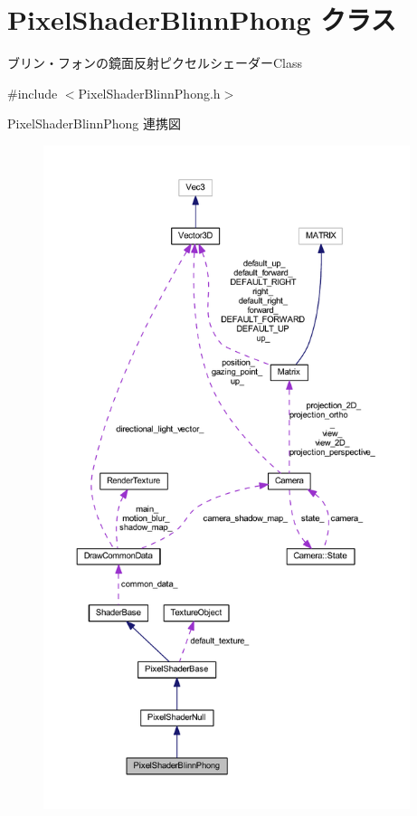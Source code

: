 \hypertarget{class_pixel_shader_blinn_phong}{}\section{Pixel\+Shader\+Blinn\+Phong クラス}
\label{class_pixel_shader_blinn_phong}


ブリン・フォンの鏡面反射ピクセルシェーダー\+Class  




{\ttfamily \#include $<$Pixel\+Shader\+Blinn\+Phong.\+h$>$}



Pixel\+Shader\+Blinn\+Phong 連携図\nopagebreak
\begin{figure}[H]
\begin{center}
\leavevmode
\includegraphics[height=550pt]{class_pixel_shader_blinn_phong__coll__graph}
\end{center}
\end{figure}
